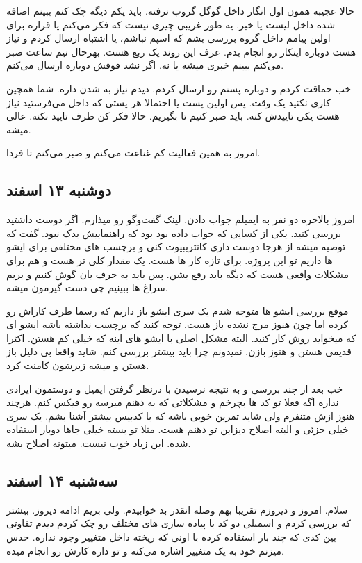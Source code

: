 حالا عجیبه همون اول انگار داخل گوگل گروپ نرفته. باید یکم دیگه چک کنم ببینم اضافه شده داخل لیست یا خیر. یه طور غریبی چیزی نیست که 
فکر می‌کنم یا قراره برای اولین پیامم داخل گروه بررسی بشم که اسپم نباشم، یا اشتباه ارسال کردم و نیاز هست دوباره اینکار رو انجام بدم. عرف این روند
یک ربع هست. بهرحال نیم ساعت صبر می‌کنم ببینم خبری میشه یا نه. اگر نشد فوقش دوباره ارسال می‌کنم.

خب حماقت کردم و دوباره پستم رو ارسال کردم. دیدم نیاز به  شدن داره. شما همچین کاری نکنید یک وقت. پس اولین پست یا احتمالا
هر پستی که داخل  می‌فرستید نیاز هست یکی تاییدش کنه. باید صبر کنیم تا  بگیریم. حالا فکر کن طرف تایید نکنه. عالی میشه.

امروز به همین فعالیت کم غناعت می‌کنم و صبر می‌کنم تا فردا.

\subsection{دوشنبه ۱۳ اسفند}
امروز بالاخره دو نفر به ایمیلم جواب دادن. لینک گفت‌وگو رو میذارم.
اگر دوست داشتید بررسی کنید. یکی از کسایی که جواب داده بود  بود که راهنماییش بدک نبود. گفت که توصیه میشه
از هرجا دوست داری کانتریبیوت کنی و برچسب های مختلفی برای ایشو ها داریم تو این پروژه.  برای تازه کار ها هست. 
یک مقدار کلی تر هست و  هم برای مشکلات واقعی هست که دیگه باید رفع بشن. پس باید به حرف یان گوش کنیم و بریم سراغ 
ها ببینیم چی دست گیرمون میشه.

موقع بررسی ایشو ها متوجه شدم یک سری ایشو باز داریم که رسما طرف کاراش رو کرده اما چون هنوز مرج نشده باز هست.
توجه کنید که برچسب  نداشته باشه ایشو ای که میخواید روش کار کنید. البته مشکل اصلی با ایشو های  اینه که خیلی کم هستن.
اکثرا قدیمی هستن و هنوز بازن. نمیدونم چرا باید بیشتر بررسی کنم. شاید واقعا بی دلیل باز هستن و میشه زیرشون کامنت کرد.

خب بعد از چند بررسی و به نتیجه نرسیدن با درنظر گرفتن ایمیل  و دوستمون ایرادی نداره اگه فعلا تو کد ها بچرخم و مشکلاتی که به ذهنم میرسه
رو فیکس کنم. هرچند هنوز ازش متنفرم ولی شاید تمرین خوبی باشه که با کدبیس بیشتر آشنا بشم. یک سری 
خیلی جزئی و البته اصلاح دیزاین تو ذهنم هست. مثلا تو بسته  خیلی جاها دوبار  استفاده شده. این زیاد خوب نیست. میتونه اصلاح بشه.

\subsection{سه‌شنبه ۱۴ اسفند}
سلام. امروز و دیروزم تقریبا بهم وصله انقدر بد خوابیدم. ولی بریم ادامه دیروز.
بیشتر که بررسی کردم و اسمبلی دو کد با پیاده سازی های مختلف رو چک کردم دیدم تفاوتی بین کدی که چند بار  استفاده کرده با اونی که ریخته
داخل متغییر وجود نداره. حدس میزنم خود  به یک متغییر اشاره می‌کنه و تو  داره کارش رو انجام میده.

